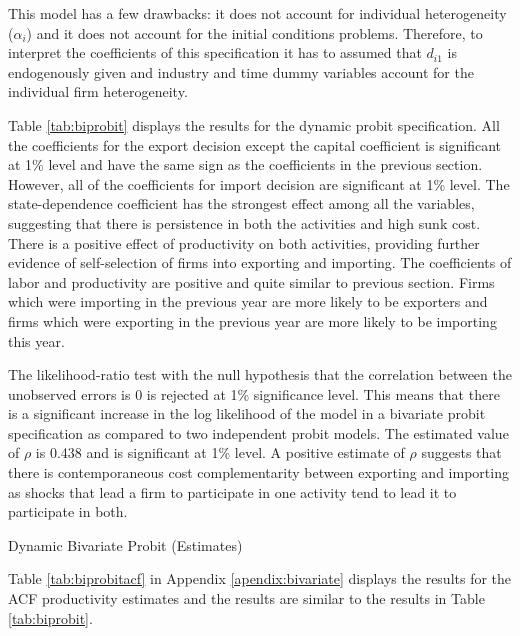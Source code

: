 \documentclass[12pt]{article}
\begin{document}
This model has a few drawbacks: it does not account for individual
heterogeneity ($\alpha_{i}$) and it does not account for the  initial
conditions problems. Therefore, to interpret the coefficients of this
specification it has to assumed that $d_{i1}$ is 
endogenously given and  industry and time dummy variables account
for the individual firm heterogeneity.

Table \ref{tab:biprobit} displays the results for the dynamic probit specification. All
  the coefficients for the export decision except the capital coefficient is significant at
  1\% level and have the same sign 
  as the coefficients in the previous section. However,  all of the coefficients
  for import decision are significant at 1\% level. The
  state-dependence coefficient has the strongest effect among all
  the variables, suggesting that there is persistence in both the
  activities and high sunk cost. There is a positive effect of 
  productivity on both activities, providing further evidence of
  self-selection of firms into exporting and importing. The
  coefficients of labor and productivity are positive and
  quite similar to previous section. Firms which were importing in the previous year are more
  likely to be exporters and firms which were exporting in the
  previous year are more likely to be importing this year.

 The likelihood-ratio test with the null hypothesis that
  the correlation between the unobserved errors is 0 is rejected at
  1\% significance level. This means that there is a significant
  increase in the log likelihood of the model in a bivariate probit
  specification as compared to two independent probit models.
The estimated value of $\rho$ is 0.438 and
  is significant at 1\% level. A positive estimate of $\rho$ suggests that there is
  contemporaneous cost complementarity between exporting and importing 
as shocks that lead a firm to participate in one activity tend
to lead it to participate in both.


\begin{center}
\begin{table}[H]
\caption{Dynamic Bivariate Probit (Estimates)}
\label{tab:biprobit}

\end{table}
\end{center} 

Table \ref{tab:biprobitacf} in Appendix \ref{apendix:bivariate} displays the results for the ACF
productivity estimates and the results are similar to the results in Table \ref{tab:biprobit}. 
 
\end{document}
